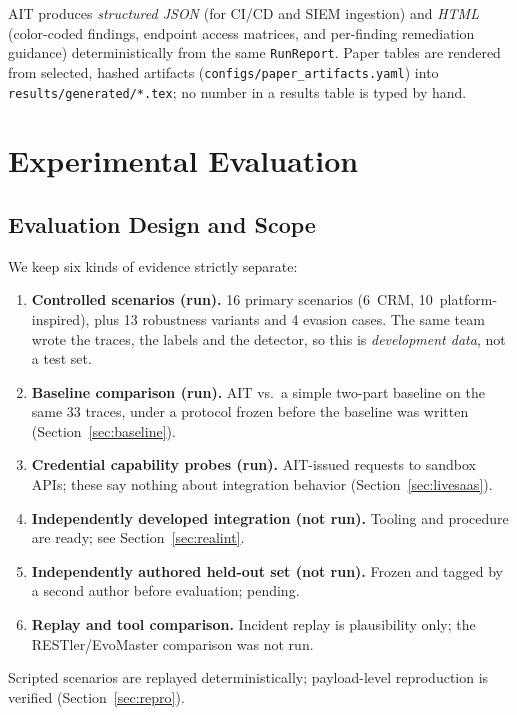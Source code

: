 \documentclass[conference]{IEEEtran}
\begin{document}
AIT produces \emph{structured JSON} (for CI/CD and SIEM ingestion)
and \emph{HTML} (color-coded findings, endpoint access matrices, and
per-finding remediation guidance) deterministically from the same
\texttt{RunReport}. Paper tables are rendered from selected, hashed
artifacts (\texttt{configs/paper\_artifacts.yaml}) into
\texttt{results/generated/*.tex}; no number in a results table is typed
by hand.

\section{Experimental Evaluation}
\label{sec:eval}

\subsection{Evaluation Design and Scope}
\label{sec:evalscope}

We keep six kinds of evidence strictly separate:

\begin{enumerate}
  \item \textbf{Controlled scenarios (run).} 16 primary scenarios (6~CRM,
        10~platform-inspired), plus 13 robustness variants and 4 evasion
        cases. The same team wrote the traces, the labels and the detector,
        so this is \emph{development data}, not a test set.
  \item \textbf{Baseline comparison (run).} AIT vs.\ a simple two-part
        baseline on the same 33 traces, under a protocol frozen before
        the baseline was written (Section~\ref{sec:baseline}).
  \item \textbf{Credential capability probes (run).} AIT-issued requests
        to sandbox APIs; these say nothing about integration behavior
        (Section~\ref{sec:livesaas}).
  \item \textbf{Independently developed integration (not run).}
        Tooling and procedure are ready; see Section~\ref{sec:realint}.
  \item \textbf{Independently authored held-out set (not run).} Frozen
        and tagged by a second author before evaluation; pending.
  \item \textbf{Replay and tool comparison.} Incident replay is
        plausibility only; the RESTler/EvoMaster comparison was not run.
\end{enumerate}

\noindent Scripted scenarios are replayed deterministically; payload-level
reproduction is verified (Section~\ref{sec:repro}).
\end{document}
